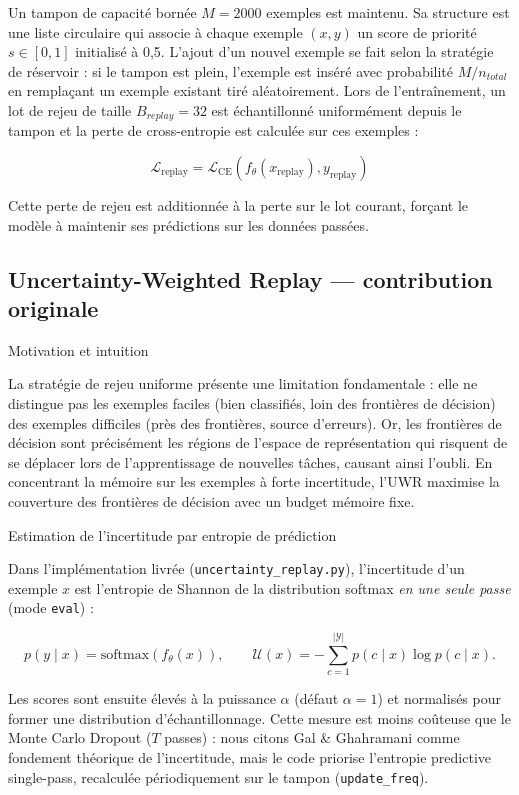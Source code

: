 \documentclass[a4paper,12pt]{report}
\begin{document}
Un tampon de capacité bornée $M = 2000$ exemples est maintenu. Sa structure est une liste circulaire qui associe à chaque exemple $(x, y)$ un score de priorité $s \in [0, 1]$ initialisé à 0,5. L'ajout d'un nouvel exemple se fait selon la stratégie de réservoir : si le tampon est plein, l'exemple est inséré avec probabilité $M / n_{total}$ en remplaçant un exemple existant tiré aléatoirement. Lors de l'entraînement, un lot de rejeu de taille $B_{replay} = 32$ est échantillonné uniformément depuis le tampon et la perte de cross-entropie est calculée sur ces exemples :

$$\mathcal{L}_{\mathrm{replay}} = \mathcal{L}_{\mathrm{CE}}(f_\theta(x_{\mathrm{replay}}), y_{\mathrm{replay}})$$

Cette perte de rejeu est additionnée à la perte sur le lot courant, forçant le modèle à maintenir ses prédictions sur les données passées.

\subsection{Uncertainty-Weighted Replay — contribution originale}

Motivation et intuition

La stratégie de rejeu uniforme présente une limitation fondamentale : elle ne distingue pas les exemples faciles (bien classifiés, loin des frontières de décision) des exemples difficiles (près des frontières, source d'erreurs). Or, les frontières de décision sont précisément les régions de l'espace de représentation qui risquent de se déplacer lors de l'apprentissage de nouvelles tâches, causant ainsi l'oubli. En concentrant la mémoire sur les exemples à forte incertitude, l'UWR maximise la couverture des frontières de décision avec un budget mémoire fixe.

Estimation de l'incertitude par entropie de prédiction

Dans l'implémentation livrée (\texttt{uncertainty\_replay.py}), l'incertitude d'un exemple $x$ est l'entropie de Shannon de la distribution softmax \emph{en une seule passe} (mode \texttt{eval}) :

$$p(y \mid x) = \mathrm{softmax}(f_\theta(x)), \qquad
\mathcal{U}(x) = -\sum_{c=1}^{|\mathcal{Y}|} p(c \mid x) \log p(c \mid x).$$

Les scores sont ensuite élevés à la puissance $\alpha$ (défaut $\alpha=1$) et normalisés pour former une distribution d'échantillonnage. Cette mesure est moins coûteuse que le Monte Carlo Dropout \parencite{gal2016} ($T$ passes) : nous citons Gal \& Ghahramani comme fondement théorique de l'incertitude, mais le code priorise l'entropie predictive single-pass, recalculée périodiquement sur le tampon (\texttt{update\_freq}).
\end{document}
